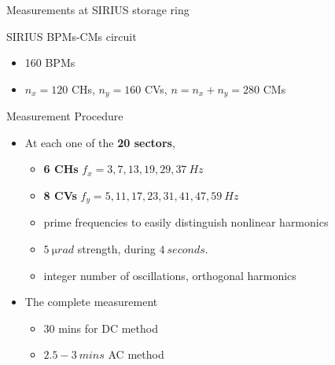 \documentclass[aspectratio=169]{beamer}
\begin{document}
\begin{frame}{Measurements at SIRIUS storage ring}
    \begin{minipage}{0.49\textwidth}
        \scriptsize
        SIRIUS BPMs-CMs circuit
        \begin{itemize}
            \item 160 BPMs
            \item $n_x = 120$ CHs, $n_y=160$ CVs, $n=n_x+n_y=280$ CMs
        \end{itemize}
        \pause
        Measurement Procedure
        \begin{itemize}
            \item At each one of the \textbf{20 sectors},
            \begin{itemize}
            \scriptsize
            \item \textbf{6 CHs} $f_x = 3,  7, 13, 19, 29, 37\ \unit{Hz}$
            \item \textbf{8 CVs} $f_y = 5, 11, 17, 23, 31, 41, 47, 59\ \unit{Hz}$
            \item prime frequencies to easily distinguish nonlinear harmonics
            \item $\unit{5~\micro rad}$ strength, during $\unit{4~seconds}$.
            \item integer number of oscillations, orthogonal harmonics
            \end{itemize}
            \item  The complete measurement
            \begin{itemize}
                \scriptsize
                \item 30 mins for DC method
                \item $2.5-3\ \unit{mins}$ AC method
            \end{itemize}
        \end{itemize}
    \pause
    \end{minipage}
    \pause
    \hfill
    \begin{minipage}{0.49\textwidth}

\end{minipage}
\end{frame}
\end{document}
